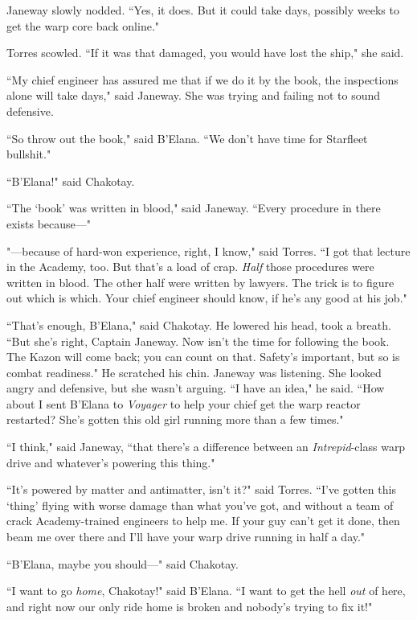 \documentclass[twoside,letterpaper,12pt]{memoir}
\begin{document}
Janeway slowly nodded. ``Yes, it does. But it could take days, possibly weeks to get the warp core back online."

Torres scowled. ``If it was that damaged, you would have lost the ship," she said.

``My chief engineer has assured me that if we do it by the book, the inspections alone will take days," said Janeway. She was trying and failing not to sound defensive.

``So throw out the book," said B'Elana. ``We don't have time for Starfleet bullshit."

``B'Elana!" said Chakotay.

``The `book' was written in blood," said Janeway. ``Every procedure in there exists because---"

"---because of hard-won experience, right, I know," said Torres. ``I got that lecture in the Academy, too. But that's a load of crap. \textit{Half} those procedures were written in blood. The other half were written by lawyers. The trick is to figure out which is which. Your chief engineer should know, if he’s any good at his job."

``That's enough, B'Elana," said Chakotay. He lowered his head, took a breath. ``But she's right, Captain Janeway. Now isn't the time for following the book. The Kazon will come back; you can count on that. Safety's important, but so is combat readiness." He scratched his chin. Janeway was listening. She looked angry and defensive, but she wasn't arguing. ``I have an idea," he said. ``How about I sent B'Elana to \textit{Voyager} to help your chief get the warp reactor restarted? She's gotten this old girl running more than a few times."

``I think," said Janeway, ``that there's a difference between an \textit{Intrepid}-class warp drive and whatever's powering this thing."

``It's powered by matter and antimatter, isn't it?" said Torres. ``I've gotten this `thing' flying with worse damage than what you've got, and without a team of crack Academy-trained engineers to help me. If your guy can't get it done, then beam me over there and I'll have your warp drive running in half a day."

``B'Elana, maybe you should---" said Chakotay.

``I want to go \textit{home}, Chakotay!" said B'Elana. ``I want to get the hell \textit{out} of here, and right now our only ride home is broken and nobody's trying to fix it!"
\end{document}
